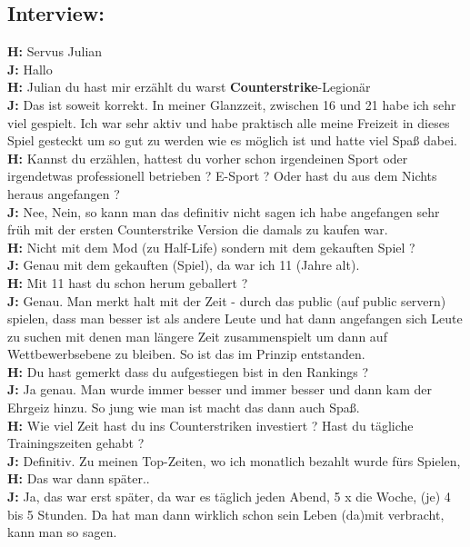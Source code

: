 \documentclass[10pt,a4paper,ngerman,twoside]{article} %
\begin{document}
\subsection*{Interview:}
\textbf{H:} Servus Julian
\\ \textbf{J:} Hallo
\\ \textbf{H:} Julian du hast mir erzählt du warst \textbf{Counterstrike}-Legionär
\\ \textbf{J:} Das ist soweit korrekt. In meiner Glanzzeit, zwischen 16 und 21 habe ich sehr viel gespielt. Ich war sehr aktiv und habe praktisch alle meine Freizeit in dieses Spiel gesteckt um so gut zu werden wie es möglich ist und hatte viel Spaß dabei.
\\ \textbf{H:} Kannst du erzählen, hattest du vorher schon irgendeinen Sport oder irgendetwas professionell betrieben ? E-Sport ? Oder hast du aus dem Nichts heraus angefangen ?
\\ \textbf{J:} Nee, Nein, so kann man das definitiv nicht sagen ich habe angefangen sehr früh mit der ersten Counterstrike Version die damals zu kaufen war.
\\ \textbf{H:} Nicht mit dem Mod (zu Half-Life) sondern mit dem gekauften Spiel ?
\\ \textbf{J:} Genau mit dem gekauften (Spiel), da war ich 11 (Jahre alt).
\\ \textbf{H:} Mit 11 hast du schon herum geballert ?
\\ \textbf{J:} Genau. Man merkt halt mit der Zeit - durch das public (auf public servern) spielen, dass man besser ist als andere Leute und hat dann angefangen sich Leute zu suchen mit denen man längere Zeit zusammenspielt um dann auf Wettbewerbsebene zu bleiben. So ist das im Prinzip entstanden.
\\ \textbf{H:} Du hast gemerkt dass du aufgestiegen bist in den Rankings ?
\\ \textbf{J:} Ja genau. Man wurde immer besser und immer besser und dann kam der Ehrgeiz hinzu. So jung wie man ist macht das dann auch Spaß.
\\ \textbf{H:} Wie viel Zeit hast du ins Counterstriken investiert ? Hast du tägliche Trainingszeiten gehabt ?
\\ \textbf{J:} Definitiv. Zu meinen Top-Zeiten, wo ich monatlich bezahlt wurde fürs Spielen,
\\ \textbf{H:} Das war dann später..
\\ \textbf{J:} Ja, das war erst später, da war es täglich jeden Abend, 5 x die Woche, (je) 4 bis 5 Stunden. Da hat man dann wirklich schon sein Leben (da)mit verbracht, kann man so sagen.
\end{document}
